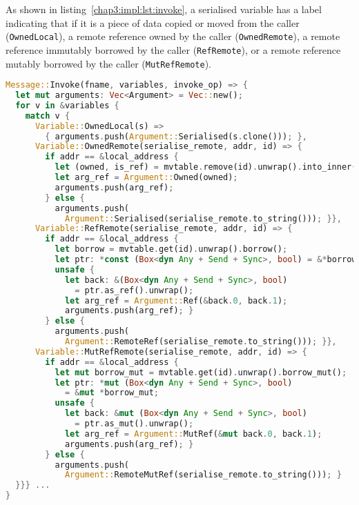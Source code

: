 As shown in listing~\ref{chap3:impl:lst:invoke}, a serialised variable has a label indicating that if it is a piece of data copied or moved from the caller (\texttt{OwnedLocal}), a remote reference owned by the caller (\texttt{OwnedRemote}), a remote reference immutably borrowed by the caller (\texttt{RefRemote}), or a remote reference mutably borrowed by the caller (\texttt{MutRefRemote}).

\begin{lstlisting}[language=Rust, style=boxed, basicstyle=\footnotesize\ttfamily, caption={Gathering variables from an invocation message}, label=chap3:impl:lst:invoke]
Message::Invoke(fname, variables, invoke_op) => {
  let mut arguments: Vec<Argument> = Vec::new();
  for v in &variables {
    match v {
      Variable::OwnedLocal(s) => 
        { arguments.push(Argument::Serialised(s.clone())); },
      Variable::OwnedRemote(serialise_remote, addr, id) => {
        if addr == &local_address {
          let (owned, is_ref) = mvtable.remove(id).unwrap().into_inner();
          let arg_ref = Argument::Owned(owned);
          arguments.push(arg_ref);
        } else { 
          arguments.push(
            Argument::Serialised(serialise_remote.to_string())); }},
      Variable::RefRemote(serialise_remote, addr, id) => {
        if addr == &local_address {
          let borrow = mvtable.get(id).unwrap().borrow();
          let ptr: *const (Box<dyn Any + Send + Sync>, bool) = &*borrow;
          unsafe {
            let back: &(Box<dyn Any + Send + Sync>, bool) 
              = ptr.as_ref().unwrap();
            let arg_ref = Argument::Ref(&back.0, back.1);
            arguments.push(arg_ref); }
        } else { 
          arguments.push(
            Argument::RemoteRef(serialise_remote.to_string())); }},
      Variable::MutRefRemote(serialise_remote, addr, id) => {
        if addr == &local_address {
          let mut borrow_mut = mvtable.get(id).unwrap().borrow_mut();
          let ptr: *mut (Box<dyn Any + Send + Sync>, bool)
            = &mut *borrow_mut;
          unsafe {
            let back: &mut (Box<dyn Any + Send + Sync>, bool) 
              = ptr.as_mut().unwrap();
            let arg_ref = Argument::MutRef(&mut back.0, back.1);
            arguments.push(arg_ref); }
        } else { 
          arguments.push(
            Argument::RemoteMutRef(serialise_remote.to_string())); }
  }}} ...
}
\end{lstlisting}

